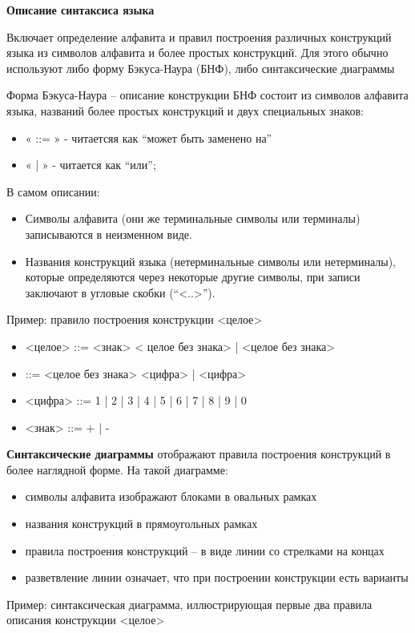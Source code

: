{\bf{Описание синтаксиса языка}}

Включает определение алфавита и правил построения различных конструкций языка из символов алфавита и более простых конструкций. Для этого обычно используют либо форму Бэкуса-Наура (БНФ), либо синтаксические диаграммы

Форма Бэкуса-Наура – описание конструкции БНФ состоит из символов алфавита языка, названий более простых конструкций и двух специальных знаков:
\begin{itemize}
\item « ::= » - читаетсяя как “может быть заменено на”
\item « | » - читается как “или”; 
\end{itemize}
В самом описании:

\begin{itemize}
\item Символы алфавита (они же терминальные символы или терминалы) записываются в неизменном виде.
\item Названия конструкций языка (нетерминальные символы или нетерминалы), которые определяются через некоторые другие символы, при записи заключают в угловые скобки (“<..>”).
\end{itemize}
Пример: правило построения конструкции <целое>
\begin{itemize}
    \item <целое> ::= <знак> < целое без знака> | <целое без знака>
    \item <целое без знака> ::= <целое без знака> <цифра> | <цифра>
    \item <цифра> ::= 1 | 2 | 3 | 4 | 5 | 6 | 7 | 8 | 9 | 0
    \item <знак>  ::= + | -
\end{itemize}

{\bf{Синтаксические диаграммы}}
отображают правила построения конструкций в более наглядной форме.
На такой диаграмме:
\begin{itemize}
\item символы алфавита изображают блоками в овальных рамках
\item названия конструкций в прямоугольных рамках
\item правила построения конструкций – в виде линии со стрелками на концах
\item разветвление линии означает, что при построении конструкции есть варианты 
\end{itemize}
Пример: синтаксическая диаграмма, иллюстрирующая первые два правила описания конструкции <целое>

